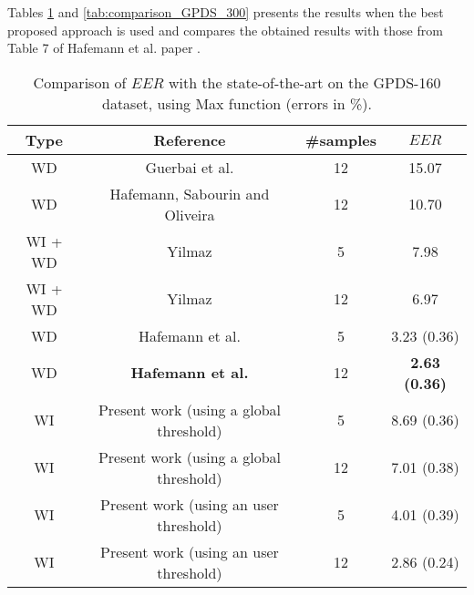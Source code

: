 \documentclass[conference]{IEEEtran}
\begin{document}
Tables \ref{tab:comparison_GPDS_160} and \ref{tab:comparison_GPDS_300} presents the results when the best proposed approach is used and compares the obtained results with those from Table 7 of Hafemann et al. paper \cite{hafemann:17}.




\begin{table}[!htb]
\caption{Comparison of $EER$ with the state-of-the-art on the GPDS-160 dataset, using Max function (errors in \%).}
\label{tab:comparison_GPDS_160}
\scriptsize
\centering


\begin{tabular}{cccc}
\hline
Type & Reference & \#samples & $EER$ \\ 
\hline
WD & Guerbai et al. \cite{guerbai:15} & 12  &  15.07 \\ 
WD & Hafemann, Sabourin and Oliveira \cite{hafemann:16} & 12  & 10.70 \\ 
WI + WD & Yilmaz \cite{yilmaz:16} & 5  &  7.98 \\ 
WI + WD & Yilmaz \cite{yilmaz:16} & 12  &  6.97 \\
WD & Hafemann et al. \cite{hafemann:17} & 5 &  3.23 (0.36) \\ 
WD & \textbf{Hafemann et al. \cite{hafemann:17}} & 12  &  \textbf{2.63 (0.36)} \\ 
WI & Present work (using a global threshold) & 5 & 8.69 (0.36) \\ 
WI & Present work (using a global threshold) & 12  & 7.01 (0.38) \\
WI & Present work (using an user threshold) & 5 & 4.01 (0.39) \\ 
WI & Present work (using an user threshold) & 12  & 2.86 (0.24) \\ 
\hline


\end{tabular}
\end{table}
\end{document}
